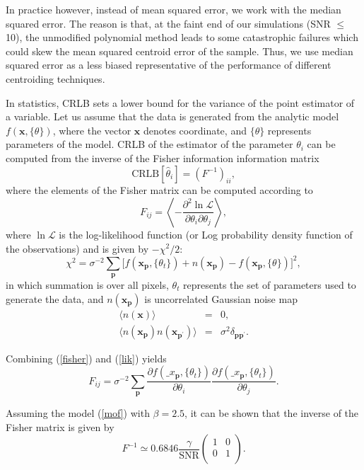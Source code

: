 \documentclass[12pt, preprint]{aastex}
\newcommand{\beq}{\begin{equation}}
\newcommand{\eeq}{\end{equation}}
\begin{document}
In practice however, instead of mean squared error, we work with the median squared error. The reason is that, at the faint end of our simulations (SNR $\leq$ 10), the unmodified polynomial method leads to some catastrophic failures which could skew the mean squared centroid error of the sample. Thus, we use median squared error as a less biased representative of the performance of different centroiding techniques. 
 
In statistics, CRLB sets a lower bound for the variance of the point estimator of a variable. Let us assume that the data is generated from the analytic model $f(\mathbf{x}, \{\theta\})$, where the vector $\mathbf{x}$ denotes coordinate, and $\{\theta\}$ represents parameters of the model. CRLB of the  estimator of the parameter $\theta_{i}$ can be computed from the inverse of the Fisher information information matrix  
\beq
\text{CRLB}[\hat{\theta}_{i}] = (F^{-1})_{ii}, 
\label{crlb}
\eeq
where the elements of the Fisher matrix can be computed according to
\beq
F_{ij} = \left \langle -\frac{\partial^{2} \ln \mathcal{L}}{\partial \theta_{i}\partial \theta_{j}} \right \rangle,   
\label{fisher}
\eeq
where $\ln \mathcal{L}$ is the log-likelihood function (or Log probability density function of the observations) and is given by $-\chi^{2}/2$: 
\beq
\chi^{2} = \sigma^{-2}\sum_{\mathbf{p}}\big [ f(\mathbf{x}_{\mathbf{p}},\{\theta_{t}\})+ n(\mathbf{x}_\mathbf{p}) - f(\mathbf{x}_{\mathbf{p}},\{\theta\}) \big ]^{2},
\label{lik}
\eeq
in which summation is over all pixels, ${\theta_{t}}$ represents the set of parameters used to generate the data, and $n(\mathbf{x}_{\mathbf{p}})$ is uncorrelated Gaussian noise map
\begin{eqnarray}
\langle n(\mathbf{x}) \rangle &=& 0, \\
\langle n(\mathbf{x_{p}})n(\mathbf{x_{p^{\prime}}}) \rangle &=& \sigma^{2}\delta_{\mathbf{p}\mathbf{p}^{\prime}}. 
\end{eqnarray}
  
Combining (\ref{fisher}) and (\ref{lik}) yields
\beq
F_{ij} = \sigma^{-2}\sum_{\mathbf{p}}\frac{\partial f(\mathbf_{x}_{\mathbf{p}} , \{\theta_{t}\})}{\partial \theta_{i}}\frac{\partial f(\mathbf_{x}_{\mathbf{p}} , \{\theta_{t}\})}{\partial \theta_{j}}.
\eeq 

Assuming the model (\ref{mof}) with $\beta = 2.5$, it can be shown that the inverse of the Fisher matrix is given by
\beq
  F^{-1} \simeq 0.6846 \frac{\gamma}{\text{SNR}} 
  \begin{pmatrix}
      1 & 0\\
      0 & 1\\
  \end{pmatrix}.
\label{crlbmoffat}
\eeq
\end{document}
